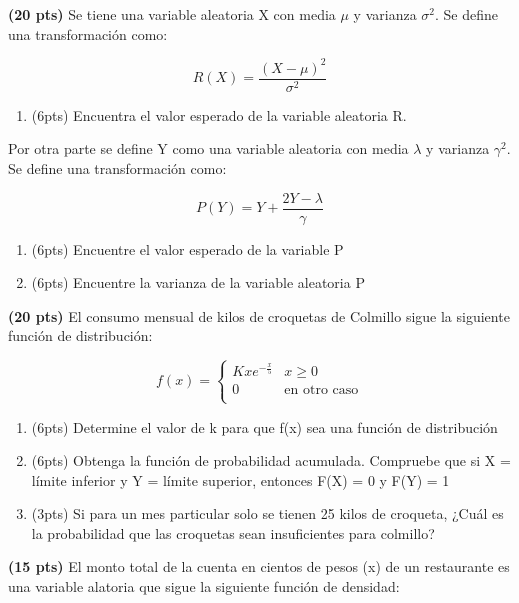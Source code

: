 \documentclass[addpoints]{exam}
\theoremstyle{mytheor}
\begin{document}
  \begin{questions}

\question \textbf{(20 pts)}
Se tiene una variable aleatoria X con media $\mu$ y varianza $\sigma^2$. Se define una transformación como: 

$$R(X) = \frac{(X-\mu)^2}{\sigma^2}$$

\begin{enumerate}[label=\Alph*)]
\item (6pts) Encuentra el valor esperado de la variable aleatoria R.
\end{enumerate}

Por otra parte se define Y como una variable aleatoria con media $\lambda$ y varianza $\gamma^2$. Se define una transformación como:

$$P(Y) = Y + \frac{2Y-\lambda}{\gamma}$$

\begin{enumerate}[label=\Alph*)]
\item (6pts) Encuentre el valor esperado de la variable P
\item (6pts) Encuentre la varianza de la variable aleatoria P
\end{enumerate}


\question \textbf{(20 pts)}
El consumo mensual de kilos de croquetas de Colmillo sigue la siguiente función de distribución:

\[   
f(x) = 
     \begin{cases}
       Kxe^{-\frac{x}{5}} & x \geq 0\\
       0 & \text{en otro caso} \\
     \end{cases}
\]
$$$$

\begin{enumerate}[label=\Alph*)]
\item (6pts) Determine el valor de k para que f(x) sea una función de distribución
\item (6pts) Obtenga la función de probabilidad acumulada. Compruebe que si X = límite inferior y Y = límite superior, entonces F(X) = 0 y F(Y) = 1
\item (3pts) Si para un mes particular solo se tienen 25 kilos de croqueta, ¿Cuál es la probabilidad que las croquetas sean insuficientes para colmillo?
\end{enumerate}

\question \textbf{(15 pts)}
El monto total de la cuenta en cientos de pesos (x) de un restaurante es una variable alatoria que sigue la siguiente función de densidad:



\end{questions}
\end{document}
